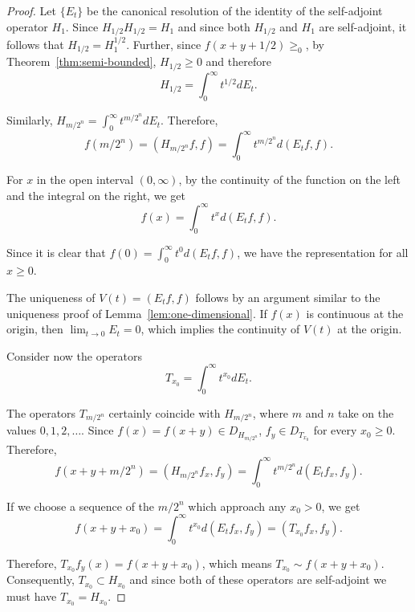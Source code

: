 \documentclass{article}
\begin{document}
\begin{proof}
Let $\{E_t\}$ be the canonical resolution of the identity of the self-adjoint operator $H_1$. Since $H_{1/2} H_{1/2} = H_1$ and since both $H_{1/2}$ and $H_1$ are self-adjoint, it follows that $H_{1/2} = H_1^{1/2}$. Further, since $f(x+y+1/2) \geq_0$, by Theorem~\ref{thm:semi-bounded}, $H_{1/2} \geq 0$ and therefore
\begin{equation}
H_{1/2} = \int_0^{\infty} t^{1/2} dE_t.
\label{eq:half-power}
\end{equation}

Similarly, $H_{m/2^n} = \int_0^{\infty} t^{m/2^n} dE_t$. Therefore,
\begin{equation}
f(m/2^n) = (H_{m/2^n} f, f) = \int_0^{\infty} t^{m/2^n} d(E_t f, f).
\label{eq:discrete-spectral}
\end{equation}

For $x$ in the open interval $(0, \infty)$, by the continuity of the function on the left and the integral on the right, we get
\begin{equation}
f(x) = \int_0^{\infty} t^x d(E_t f, f).
\label{eq:continuous-spectral}
\end{equation}

Since it is clear that $f(0) = \int_0^{\infty} t^0 d(E_t f, f)$, we have the representation for all $x \geq 0$.

The uniqueness of $V(t) = (E_t f, f)$ follows by an argument similar to the uniqueness proof of Lemma~\ref{lem:one-dimensional}. If $f(x)$ is continuous at the origin, then $\lim_{t \to 0} E_t = 0$, which implies the continuity of $V(t)$ at the origin.

Consider now the operators
\begin{equation}
T_{x_0} = \int_0^{\infty} t^{x_0} dE_t.
\label{eq:operator-definition-2}
\end{equation}

The operators $T_{m/2^n}$ certainly coincide with $H_{m/2^n}$, where $m$ and $n$ take on the values $0, 1, 2, \ldots$. Since $f(x) = f(x+y) \in D_{H_{m/2^n}}$, $f_y \in D_{T_{x_0}}$ for every $x_0 \geq 0$. Therefore,
\begin{equation}
f(x + y + m/2^n) = (H_{m/2^n} f_x, f_y) = \int_0^{\infty} t^{m/2^n} d(E_t f_x, f_y).
\label{eq:kernel-representation}
\end{equation}

If we choose a sequence of the $m/2^n$ which approach any $x_0 > 0$, we get
\begin{equation}
f(x + y + x_0) = \int_0^{\infty} t^{x_0} d(E_t f_x, f_y) = (T_{x_0} f_x, f_y).
\label{eq:limit-representation}
\end{equation}

Therefore, $T_{x_0} f_y(x) = f(x+y+x_0)$, which means $T_{x_0} \sim f(x+y+x_0)$. Consequently, $T_{x_0} \subset H_{x_0}$ and since both of these operators are self-adjoint we must have $T_{x_0} = H_{x_0}$.
\end{proof}
\end{document}
